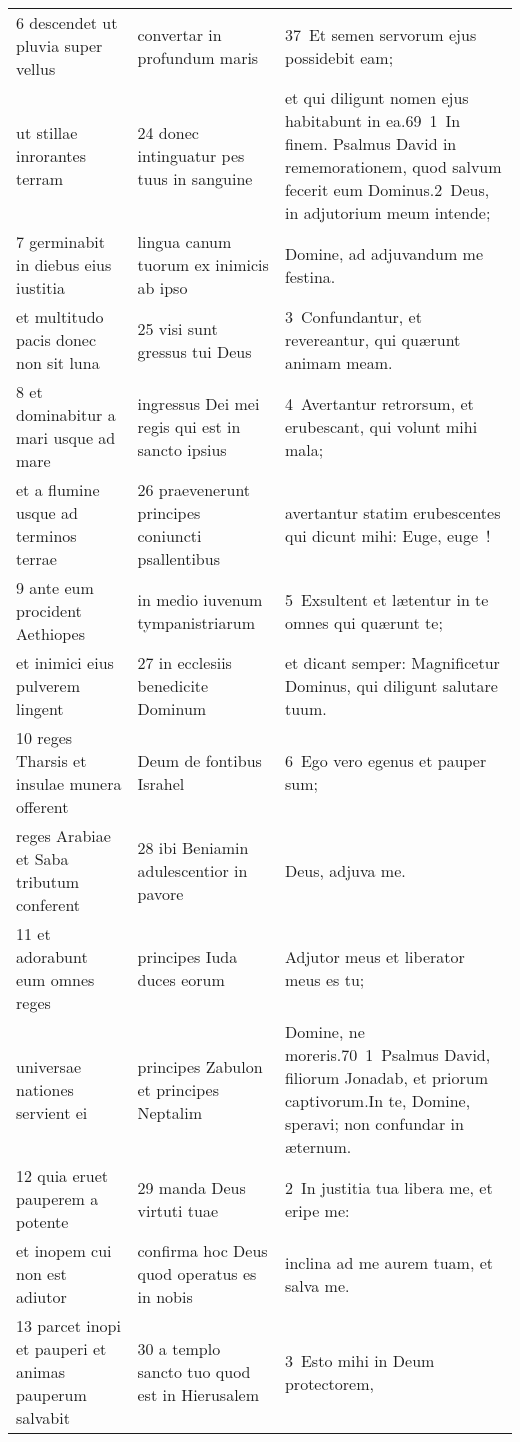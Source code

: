 \documentclass{article}
\begin{document}
\begin{longtable}{@{}p{}p{}p{}@{}}
6 descendet ut pluvia super vellus	&	convertar in profundum maris	&	37 Et semen servorum ejus possidebit eam;	\\
ut stillae inrorantes terram	&	24 donec intinguatur pes tuus in sanguine	&	et qui diligunt nomen ejus habitabunt in ea.69 1 In finem. Psalmus David in rememorationem, quod salvum fecerit eum Dominus.2 Deus, in adjutorium meum intende;	\\
7 germinabit in diebus eius iustitia	&	lingua canum tuorum ex inimicis ab ipso	&	Domine, ad adjuvandum me festina.	\\
et multitudo pacis donec non sit luna	&	25 visi sunt gressus tui Deus	&	3 Confundantur, et revereantur, qui quærunt animam meam.	\\
8 et dominabitur a mari usque ad mare	&	ingressus Dei mei regis qui est in sancto ipsius	&	4 Avertantur retrorsum, et erubescant, qui volunt mihi mala;	\\
et a flumine usque ad terminos terrae	&	26 praevenerunt principes coniuncti psallentibus	&	avertantur statim erubescentes qui dicunt mihi: Euge, euge !	\\
9 ante eum procident Aethiopes	&	in medio iuvenum tympanistriarum	&	5 Exsultent et lætentur in te omnes qui quærunt te;	\\
et inimici eius pulverem lingent	&	27 in ecclesiis benedicite Dominum	&	et dicant semper: Magnificetur Dominus, qui diligunt salutare tuum.	\\
10 reges Tharsis et insulae munera offerent	&	Deum de fontibus Israhel	&	6 Ego vero egenus et pauper sum;	\\
reges Arabiae et Saba tributum conferent	&	28 ibi Beniamin adulescentior in pavore	&	Deus, adjuva me.	\\
11 et adorabunt eum omnes reges	&	principes Iuda duces eorum	&	Adjutor meus et liberator meus es tu;	\\
universae nationes servient ei	&	principes Zabulon et principes Neptalim	&	Domine, ne moreris.70 1 Psalmus David, filiorum Jonadab, et priorum captivorum.In te, Domine, speravi; non confundar in æternum.	\\
12 quia eruet pauperem a potente	&	29 manda Deus virtuti tuae	&	2 In justitia tua libera me, et eripe me:	\\
et inopem cui non est adiutor	&	confirma hoc Deus quod operatus es in nobis	&	inclina ad me aurem tuam, et salva me.	\\
13 parcet inopi et pauperi et animas pauperum salvabit	&	30 a templo sancto tuo quod est in Hierusalem	&	3 Esto mihi in Deum protectorem,	\\

\end{longtable}
\end{document}
